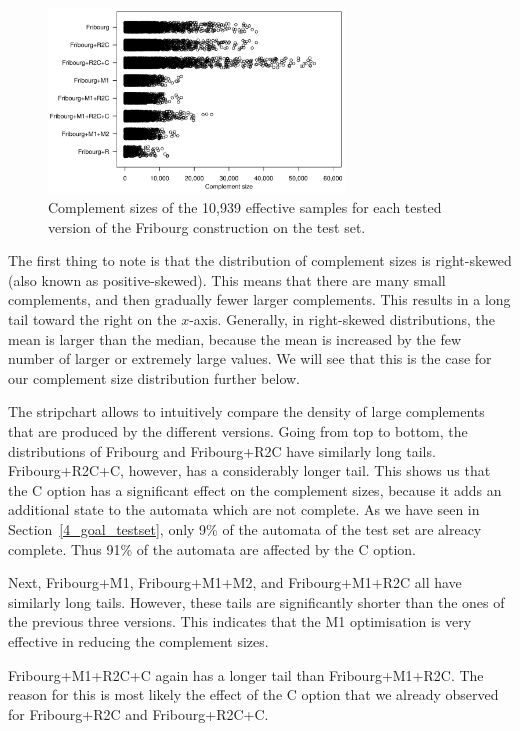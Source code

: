 \begin{figure}[ht]
\centering
\includegraphics[width=0.7\textwidth]{figures/r/internal/goal/s.stripchart.pdf}
\caption{Complement sizes of the 10,939 effective samples for each tested version of the Fribourg construction on the \goal{} test set.}
\label{i.g.stripchart}
\end{figure}

The first thing to note is that the distribution of complement sizes is right-skewed (also known as positive-skewed). This means that there are many small complements, and then gradually fewer larger complements. This results in a long tail toward the right  on the $x$-axis. Generally, in right-skewed distributions, the mean is larger than the median, because the mean is increased by the few number of larger or extremely large values. We will see that this is the case for our complement size distribution further below.

The stripchart allows to intuitively compare the density of large complements that are produced by the different versions. Going from top to bottom, the distributions of Fribourg and Fribourg+R2C have similarly long tails. Fribourg+R2C+C, however, has a considerably longer tail. This shows us that the C option has a significant effect on the complement sizes, because it adds an additional state to the automata which are not complete. As we have seen in Section~\ref{4_goal_testset}, only 9\% of the automata of the \goal{} test set are alreacy complete. Thus 91\% of the automata are affected by the C option.

Next, Fribourg+M1, Fribourg+M1+M2, and Fribourg+M1+R2C all have similarly long tails. However, these tails are significantly shorter than the ones of the previous three versions. This indicates that the M1 optimisation is very effective in reducing the complement sizes.

Fribourg+M1+R2C+C again has a longer tail than Fribourg+M1+R2C. The reason for this is most likely the effect of the C option that we already observed for Fribourg+R2C and Fribourg+R2C+C.

